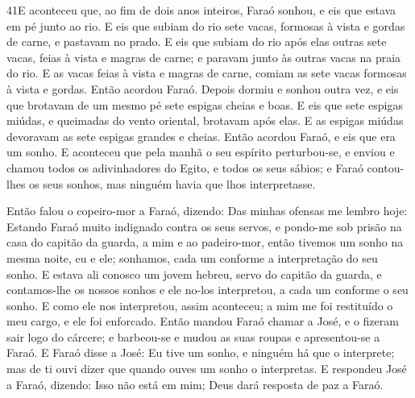 \lettrine{41} E aconteceu que, ao fim de dois anos inteiros,
Faraó sonhou, e eis que estava em pé junto ao rio. E eis que
subiam do rio sete vacas, formosas à vista e gordas de carne, e
pastavam no prado. E eis que subiam do rio após elas outras sete
vacas, feias à vista e magras de carne; e paravam junto às outras
vacas na praia do rio. E as vacas feias à vista e magras de
carne, comiam as sete vacas formosas à vista e gordas. Então acordou
Faraó. Depois dormiu e sonhou outra vez, e eis que brotavam de
um mesmo pé sete espigas cheias e boas. E eis que sete espigas
miúdas, e queimadas do vento oriental, brotavam após elas. E as
espigas miúdas devoravam as sete espigas grandes e cheias. Então
acordou Faraó, e eis que era um sonho. E aconteceu que pela
manhã o seu espírito perturbou-se, e enviou e chamou todos os
adivinhadores do Egito, e todos os seus sábios; e Faraó contou-lhes
os seus sonhos, mas ninguém havia que lhos interpretasse.

Então falou o copeiro-mor a Faraó, dizendo: Das minhas ofensas me
lembro hoje: Estando Faraó muito indignado contra os seus
servos, e pondo-me sob prisão na casa do capitão da guarda, a mim e
ao padeiro-mor, então tivemos um sonho na mesma noite, eu e
ele; sonhamos, cada um conforme a interpretação do seu sonho.
E estava ali conosco um jovem hebreu, servo do capitão da
guarda, e contamos-lhe os nossos sonhos e ele no-los interpretou, a
cada um conforme o seu sonho. E como ele nos interpretou,
assim aconteceu; a mim me foi restituído o meu cargo, e ele foi
enforcado. Então mandou Faraó chamar a José, e o fizeram sair
logo do cárcere; e barbeou-se e mudou as suas roupas e apresentou-se
a Faraó. E Faraó disse a José: Eu tive um sonho, e ninguém há
que o interprete; mas de ti ouvi dizer que quando ouves um sonho o
interpretas. E respondeu José a Faraó, dizendo: Isso não está
em mim; Deus dará resposta de paz a Faraó.

